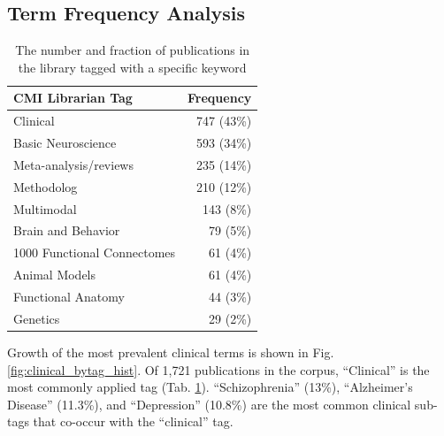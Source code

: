 \documentclass[5p]{elsarticle}
\begin{document}
\subsection{Term Frequency Analysis}

\begin{table}[H]
\caption{\label{tagfreqtable} The number and fraction of publications in the
library tagged with a specific keyword}
\begin{center}
\begin{tabular}{|l|r|}
\hline
{\bf CMI Librarian Tag}&{\bf Frequency} \\ \hline \hline
Clinical & 747 (43\%) \\ \hline
Basic Neuroscience&593 (34\%) \\ \hline
Meta-analysis/reviews&235 (14\%) \\ \hline
Methodolog&210 (12\%) \\ \hline
Multimodal&143 (8\%) \\ \hline
Brain and Behavior&79 (5\%) \\ \hline
1000 Functional Connectomes&61 (4\%) \\ \hline
Animal Models&61 (4\%) \\ \hline
Functional Anatomy&44 (3\%) \\ \hline
Genetics&29 (2\%) \\ \hline
\end{tabular}
\end{center}
\end{table}


Growth of the most prevalent clinical terms is shown in Fig.
\ref{fig:clinical_bytag_hist}. Of 1,721 publications in the corpus,
``Clinical'' is the most commonly applied tag (Tab. \ref{tagfreqtable}).
``Schizophrenia'' (13\%), ``Alzheimer's Disease'' (11.3\%), and
``Depression'' (10.8\%) are the most common clinical sub-tags that
co-occur with the ``clinical'' tag.
\end{document}

